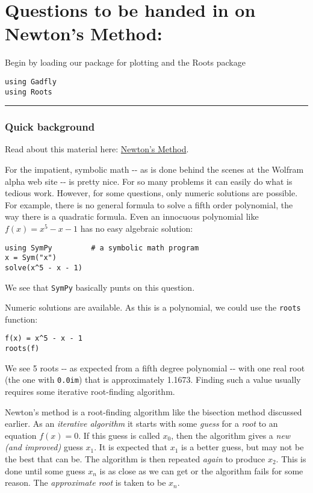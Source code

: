 \documentclass[12pt]{article}
\begin{document}
\section{Questions to be handed in on Newton's Method:}

Begin by loading our package for plotting and the Roots package



\begin{verbatim}
using Gadfly            
using Roots
\end{verbatim}
\begin{center}\rule{3in}{0.4pt}\end{center}

\subsubsection{Quick background}

Read about this material here:
\href{http://mth229.github.io/newton.html}{Newton's Method}.

For the impatient, symbolic math -{}- as is done behind the scenes at
the Wolfram alpha web site -{}- is pretty nice. For so many problems it
can easily do what is tedious work. However, for some questions, only
numeric solutions are possible. For example, there is no general formula
to solve a fifth order polynomial, the way there is a quadratic formula.
Even an innocuous polynomial like $f(x) = x^5 - x - 1$ has no easy
algebraic solution:



\begin{verbatim}
using SymPy         # a symbolic math program
x = Sym("x")
solve(x^5 - x - 1)
\end{verbatim}
We see that \texttt{SymPy} basically punts on this question.

Numeric solutions are available. As this is a polynomial, we could use
the \texttt{roots} function:



\begin{verbatim}
f(x) = x^5 - x - 1
roots(f)
\end{verbatim}
We see 5 roots -{}- as expected from a fifth degree polynomial -{}- with
one real root (the one with \texttt{0.0im}) that is approximately
1.1673. Finding such a value usually requires some iterative
root-finding algorithm.

Newton's method is a root-finding algorithm like the bisection method
discussed earlier. As an \emph{iterative algorithm} it starts with some
\emph{guess} for a \emph{root} to an equation $f(x) = 0$. If this guess
is called $x_0$, then the algorithm gives a \emph{new (and improved)}
guess $x_1$. It is expected that $x_1$ is a better guess, but may not be
the best that can be. The algorithm is then repeated \emph{again} to
produce $x_2$. This is done until some guess $x_n$ is as close as we can
get or the algorithm fails for some reason. The \emph{approximate root}
is taken to be $x_n$.
\end{document}
